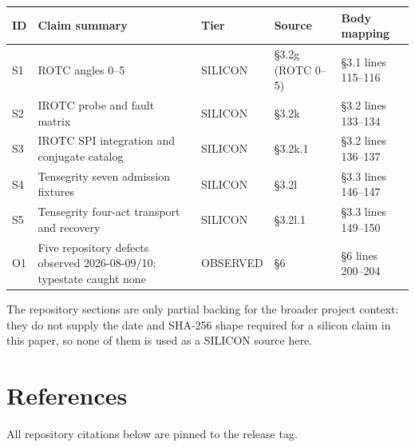 \documentclass[11pt]{article}
\begin{document}
\begin{center}

\scriptsize

\sloppy

\renewcommand{\arraystretch}{1.12}
\begin{tabularx}{\linewidth}{@{}YYYYY@{}}

\toprule

ID & Claim summary & Tier & Source & Body mapping \\

\midrule

S1 & ROTC angles 0–5 & SILICON &  §3.2g (ROTC 0–5) & §3.1 lines 115–116 \\

S2 & IROTC probe and fault matrix & SILICON &  §3.2k & §3.2 lines 133–134 \\

S3 & IROTC SPI integration and conjugate catalog & SILICON &  §3.2k.1 & §3.2 lines 136–137 \\

S4 & Tensegrity seven admission fixtures & SILICON &  §3.2l & §3.3 lines 146–147 \\

S5 & Tensegrity four-act transport and recovery & SILICON &  §3.2l.1 & §3.3 lines 149–150 \\

O1 & Five repository defects observed 2026-08-09/10; typestate caught none & OBSERVED & §6 & §6 lines 200–204 \\

\bottomrule

\end{tabularx}

\renewcommand{\arraystretch}{1.0}

\end{center}

The repository sections  are only partial backing for the broader project context: they do not supply the date and SHA-256 shape required for a silicon claim in this paper, so none of them is used as a SILICON source here.

\section{References}

All repository citations below are pinned to the  release tag.
\end{document}
